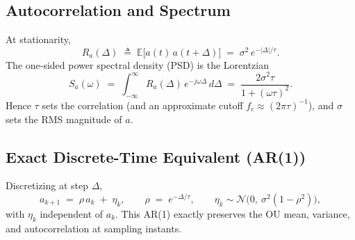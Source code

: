 \documentclass[10pt]{extarticle}
\begin{document}
\subsection{Autocorrelation and Spectrum}
At stationarity,
\begin{equation}
R_a(\Delta) \;\triangleq\; \mathbb{E}\big[a(t)\,a(t+\Delta)\big] \;=\; \sigma^2\,e^{-|\Delta|/\tau}.
\label{eq:ou-autocorr}
\end{equation}
The one-sided power spectral density (PSD) is the Lorentzian
\begin{equation}
S_a(\omega) \;=\; \int_{-\infty}^{\infty} R_a(\Delta)\,e^{-j\omega \Delta}\,d\Delta
\;=\; \frac{2\sigma^2\tau}{1+(\omega\tau)^2}.
\label{eq:ou-psd}
\end{equation}
Hence $\tau$ sets the correlation (and an approximate cutoff $f_c \approx (2\pi\tau)^{-1}$),
and $\sigma$ sets the RMS magnitude of $a$.

\subsection{Exact Discrete-Time Equivalent (AR(1))}
Discretizing at step $\Delta$,
\begin{equation}
a_{k+1} \;=\; \rho\,a_k \;+\; \eta_k,
\qquad
\rho \;=\; e^{-\Delta/\tau}, 
\qquad
\eta_k \sim \mathcal{N}\!\big(0,\ \sigma^2(1-\rho^2)\big),
\label{eq:ou-ar1}
\end{equation}
with $\eta_k$ independent of $a_k$. This AR(1) exactly preserves the OU mean, variance,
and autocorrelation at sampling instants.
\end{document}

